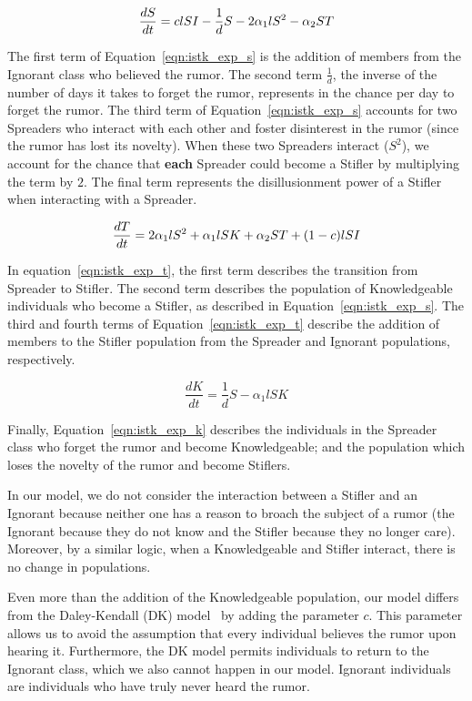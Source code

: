 \begin{equation}
\label{eqn:istk_exp_s} \frac{dS}{dt} = clSI - \frac{1}{d} S - 2 \alpha_1l S^2 - \alpha_2 ST \\
\end{equation}

The first term of Equation~\ref{eqn:istk_exp_s} is the addition of members from the Ignorant class who believed the rumor.
The second term $ \frac{1}{d} $, the inverse of the number of days it takes to forget the rumor, represents in the chance per day to forget the rumor.
The third term of Equation~\ref{eqn:istk_exp_s} accounts for two Spreaders who interact with each other and foster disinterest in the rumor (since the rumor has lost its novelty).
When these two Spreaders interact ($ S^2 $), we account for the chance that \textbf{each} Spreader could become a Stifler by multiplying the term by $ 2 $.
The final term represents the disillusionment power of a Stifler when interacting with a Spreader.

\begin{equation}
\label{eqn:istk_exp_t} \frac{dT}{dt} = 2 \alpha_1l S^2 + \alpha_1l SK + \alpha_2 ST + (1-c)lSI \\
\end{equation}

In equation~\ref{eqn:istk_exp_t}, the first term describes the transition from Spreader to Stifler.
The second term describes the population of Knowledgeable individuals who become a Stifler, as described in Equation~\ref{eqn:istk_exp_s}.
The third and fourth terms of Equation~\ref{eqn:istk_exp_t} describe the addition of members to the Stifler population from the Spreader and Ignorant populations, respectively.

\begin{equation}
\label{eqn:istk_exp_k} \frac{dK}{dt} = \frac{1}{d}S - \alpha_1l SK
\end{equation}

Finally, Equation~\ref{eqn:istk_exp_k} describes the individuals in the Spreader class who forget the rumor and become Knowledgeable; and the population which loses the novelty of the rumor and become Stiflers.

In our model, we do not consider the interaction between a Stifler and an Ignorant because neither one has a reason to broach the subject of a rumor (the Ignorant because they do not know and the Stifler because they no longer care).
Moreover, by a similar logic, when a Knowledgeable and Stifler interact, there is no change in populations.

Even more than the addition of the Knowledgeable population, our model differs from the Daley-Kendall (DK) model~\cite{daley-1965} by adding the parameter $ c $.
This parameter allows us to avoid the assumption that every individual believes the rumor upon hearing it.
Furthermore, the DK model permits individuals to return to the Ignorant class, which we also cannot happen in our model. Ignorant individuals are individuals who have truly never heard the rumor.

